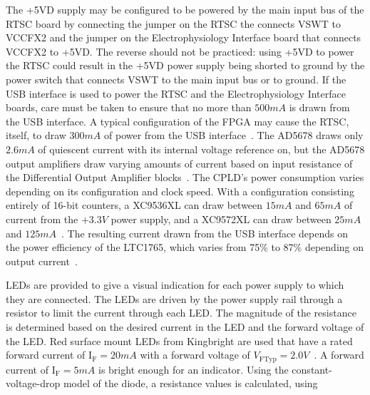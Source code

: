 The +5VD supply may be configured to be powered by the main input bus of the RTSC board by connecting the jumper on the RTSC the connects VSWT to VCCFX2 and the jumper on the Electrophysiology Interface board that connects VCCFX2 to +5VD.  The reverse should not be practiced: using +5VD to power the RTSC could result in the +5VD power supply being shorted to ground by the power switch that connects VSWT to the main input bus or to ground.  If the USB interface is used to power the RTSC and the Electrophysiology Interface boards, care must be taken to ensure that no more than $500\unit{mA}$ is drawn from the USB interface.  A typical configuration of the FPGA may cause the RTSC, itself, to draw $300\unit{mA}$ of power from the USB interface~\cite{DigilentNexys2rm}.  The AD5678 draws only $2.6\unit{mA}$ of quiescent current with its internal voltage reference on, but the AD5678 output amplifiers draw varying amounts of current based on input resistance of the Differential Output Amplifier blocks~\cite{AD5678ds}.  The CPLD's power consumption varies depending on its configuration and clock speed.  With a configuration consisting entirely of 16-bit counters, a XC9536XL can draw between $15\unit{mA}$ and $65\unit{mA}$ of current from the $+3.3\unit{V}$ power supply, and a XC9572XL can draw between $25\unit{mA}$ and $125\unit{mA}$~\cite{XC9536XLds,XC9572XLds}.  The resulting current drawn from the USB interface depends on the power efficiency of the LTC1765, which varies from 75\% to 87\% depending on output current~\cite{LT1765ds}.

LEDs are provided to give a visual indication for each power supply to which they are connected.  The LEDs are driven by the power supply rail through a resistor to limit the current through each LED.  The magnitude of the resistance is determined based on the desired current in the LED and the forward voltage of the LED.  Red surface mount LEDs from Kingbright are used that have a rated forward current of $\mathrm{I}_\mathrm{F}=20\unit{mA}$ with a forward voltage of $\unit{V}_{\mathrm{FTyp}}=2.0\unit{V}$~\cite{RedKingbrightLEDds}.  A forward current of $\mathrm{I}_\mathrm{F}=5\unit{mA}$ is bright enough for an indicator.  Using the constant-voltage-drop model of the diode, a resistance values is calculated, using

